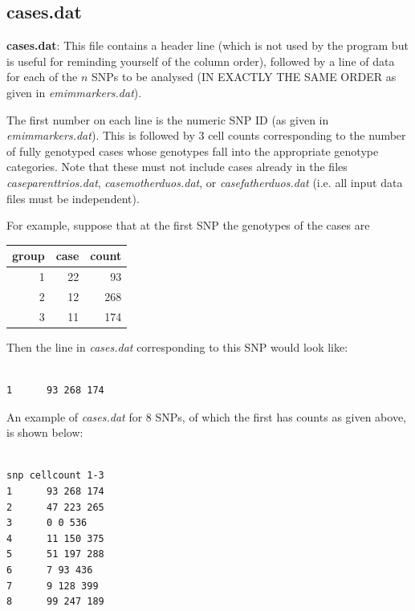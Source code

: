 \documentclass[a4paper,12pt]{article}
\begin{document}
\subsection{cases.dat}
\label{cases}

{\bf cases.dat}: This file contains a header line (which is not used by the program but is useful for reminding yourself of the column order), followed by a line of data for each of the $n$ SNPs to be analysed (IN EXACTLY THE SAME ORDER as given in {\it emimmarkers.dat}). 

The first number on each line is the numeric SNP ID (as given in {\it emimmarkers.dat}). This is followed by 3 cell counts corresponding to the number of fully genotyped cases whose genotypes fall into the appropriate genotype categories. Note that these must not include cases already in the files {\it caseparenttrios.dat}, {\it casemotherduos.dat}, or {\it casefatherduos.dat} (i.e. all input data files must be independent). 

For example, suppose that at the first SNP the genotypes of the cases are 

{\begin{center}\begin{tabular}{rrr}
group  & case  & count\\
\hline
1  & 22  & 93\\
2  & 12  & 268\\
3  & 11  & 174\\
\end{tabular}\end{center}}

Then the line in {\it cases.dat} corresponding to this SNP would look like: 
\vspace{0.35cm} \begin{lstlisting}

1      93 268 174

\end{lstlisting} \vspace{0.35cm}
An example of {\it cases.dat} for 8 SNPs, of which the first has counts as given above, is shown below: 
\vspace{0.35cm} \begin{lstlisting}

snp cellcount 1-3
1      93 268 174
2      47 223 265
3      0 0 536
4      11 150 375
5      51 197 288
6      7 93 436
7      9 128 399
8      99 247 189

\end{lstlisting} \vspace{0.35cm}
\end{document}
